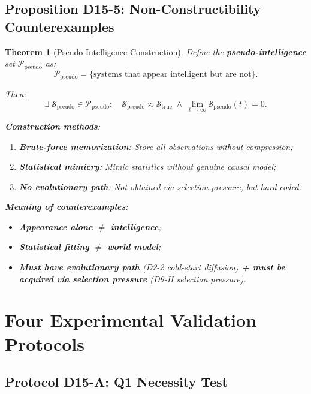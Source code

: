 \documentclass[12pt, a4paper]{article}
\newtheorem{theorem}{Theorem}[section]
\newcommand{\calP}{\mathcal{P}}
\newcommand{\calS}{\mathcal{S}}
\begin{document}
\subsection{Proposition D15-5: Non-Constructibility Counterexamples}\label{sec:theorem5}

\begin{theorem}[Pseudo-Intelligence Construction]\label{thm:psedu}
Define the \textbf{pseudo-intelligence} set $\calP_{\text{pseudo}}$ as:
\begin{equation}
\calP_{\text{pseudo}} = \{\text{systems that appear intelligent but are not}\}.
\end{equation}

Then:
\begin{equation}
\exists\;\calS_{\text{pseudo}}\in\calP_{\text{pseudo}}:\quad
\calS_{\text{pseudo}} \approx \calS_{\text{true}} \;\land\; \lim_{t\to\infty}\calS_{\text{pseudo}}(t) = 0.
\end{equation}

\noindent\textbf{Construction methods}:
\begin{enumerate}
\item \textbf{Brute-force memorization}: Store all observations without compression;
\item \textbf{Statistical mimicry}: Mimic statistics without genuine causal model;
\item \textbf{No evolutionary path}: Not obtained via selection pressure, but hard-coded.
\end{enumerate}

\noindent\textbf{Meaning of counterexamples}:
\begin{itemize}
\item \textbf{Appearance alone $\neq$ intelligence};
\item \textbf{Statistical fitting $\neq$ world model};
\item \textbf{Must have evolutionary path} (D2-2 cold-start diffusion) \textbf{+ must be acquired via selection pressure} (D9-II selection pressure).
\end{itemize}
\end{theorem}

\section{Four Experimental Validation Protocols}\label{sec:experiments}

\subsection{Protocol D15-A: Q1 Necessity Test}
\end{document}
